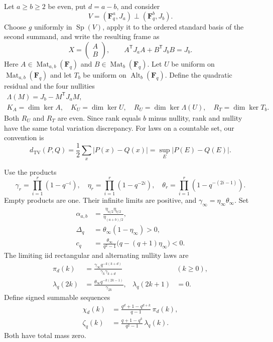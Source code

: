 \documentclass[11pt,letterpaper]{article}
\theoremstyle{remark}
\newcommand{\F}{\mathbf F}
\newcommand{\TV}{d_{\mathrm{TV}}}
\newcommand{\Alt}{\operatorname{Alt}}
\newcommand{\Mat}{\operatorname{Mat}}
\newcommand{\Sp}{\operatorname{Sp}}
\begin{document}
Let $a\ge b\ge2$ be even, put $d=a-b$, and consider
\[
 V=(\F_q^a,J_a)\perp(\F_q^b,J_b).
\]
Choose $g$ uniformly in $\Sp(V)$, apply it to the ordered standard basis of
the second summand, and write the resulting frame as
\begin{equation}\label{eq:gram}
 X=\begin{pmatrix}A\\B\end{pmatrix},\qquad
 A^{\mathsf T}J_aA+B^{\mathsf T}J_bB=J_b.
\end{equation}
Here $A\in\Mat_{a,b}(\F_q)$ and $B\in\Mat_b(\F_q)$.
Let $U$ be uniform on $\Mat_{a,b}(\F_q)$ and let $T_b$ be uniform on
$\Alt_b(\F_q)$. Define the quadratic residual and the four nullities
\begin{gather*}
 \Lambda(M)=J_b-M^{\mathsf T}J_aM,\\
 K_A=\dim\ker A,\quad K_U=\dim\ker U,\quad
 R_U=\dim\ker\Lambda(U),\quad R_T=\dim\ker T_b.
\end{gather*}
Both $R_U$ and $R_T$ are even. Since rank equals $b$ minus nullity, rank and
nullity have the same total variation discrepancy.
For laws on a countable set, our convention is
\[
 \TV(P,Q)=\frac12\sum_x|P(x)-Q(x)|=\sup_E|P(E)-Q(E)|.
\]

Use the products
\begin{equation}\label{eq:products}
 \gamma_r=\prod_{i=1}^r(1-q^{-i}),\quad
 \eta_r=\prod_{i=1}^r(1-q^{-2i}),\quad
 \theta_r=\prod_{i=1}^r(1-q^{-(2i-1)}).
\end{equation}
Empty products are one. Their infinite limits are positive, and
$\gamma_\infty=\eta_\infty\theta_\infty$.
Set
\begin{align}
 \alpha_{a,b}&=\frac{\eta_{a/2}\eta_{b/2}}{\eta_{(a+b)/2}},\label{eq:alpha}\\
 \Delta_q&=\theta_\infty(1-\eta_\infty)>0,\label{eq:delta}\\
 c_q&=\frac{\theta_\infty}{q^2-1}
       \bigl(q-(q+1)\eta_\infty\bigr)<0.\label{eq:cq}
\end{align}
The limiting iid rectangular and alternating nullity laws are
\begin{align}
 \pi_d(k)&=\frac{\gamma_\infty q^{-k(k+d)}}{\gamma_k\gamma_{k+d}}
       &&(k\ge0),\label{eq:pi}\\
 \lambda_q(2k)&=\frac{\theta_\infty q^{-k(2k-1)}}{\gamma_{2k}},
 &\lambda_q(2k+1)&=0.\label{eq:lambda}
\end{align}
Define signed summable sequences
\begin{align}
 \chi_d(k)&=\frac{q^d+1-q^{d+k}}{q-1}\,\pi_d(k),\label{eq:chi}\\
 \zeta_q(k)&=\frac{q+1-q^k}{q^2-1}\,\lambda_q(k).
 \label{eq:zeta}
\end{align}
Both have total mass zero.
\end{document}
